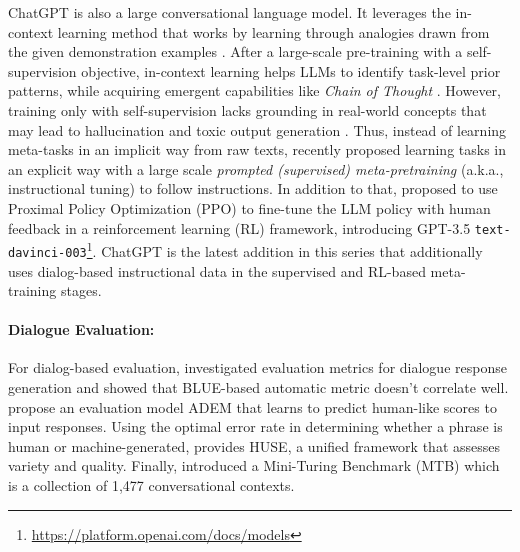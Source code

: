 \documentclass[11pt]{article}
\begin{document}
ChatGPT is also a large conversational language model. It leverages the in-context learning method that works by learning through analogies drawn from the given demonstration examples \cite{ICL_Survey}. After a large-scale pre-training with a self-supervision objective, in-context learning helps LLMs to identify task-level prior patterns, while acquiring emergent capabilities like \emph{Chain of Thought} \cite{wei_emergent}. However, training only with self-supervision lacks grounding in real-world concepts that may lead to hallucination and toxic output generation \cite{instructGPT}. Thus, instead of learning meta-tasks in an implicit way from raw texts, recently \citet{FLAN,T0,BLOOMZ,FLAN-t5,instructGPT} proposed learning tasks in an explicit way with a large scale \emph{prompted (supervised) meta-pretraining} (a.k.a., instructional tuning) to follow instructions. In addition to that, \citet{instructGPT} proposed to use Proximal Policy Optimization (PPO) to fine-tune the LLM policy with human feedback in a reinforcement learning (RL) framework, introducing GPT-3.5 \texttt{text-davinci-003}\footnote{\url{https://platform.openai.com/docs/models}}. {ChatGPT} is the latest addition in this series that additionally uses dialog-based instructional data in the supervised and RL-based meta-training stages. 


\paragraph{Dialogue Evaluation:}
\label{appendix:instruction_tuning_datasets}
For dialog-based evaluation, \citet{liu-etal-2016-evaluate}  investigated evaluation metrics for dialogue response generation and showed that BLUE-based automatic metric doesn't correlate well. \citet{lowe17} propose an evaluation model ADEM that learns to predict human-like scores to input responses. Using the optimal error rate in determining whether a phrase is human or machine-generated, \citet{hashimoto19} provides HUSE, a unified framework that assesses variety and quality. Finally, \citet{meena} introduced a Mini-Turing Benchmark (MTB) which is a collection of 1,477 conversational contexts. 
\end{document}
